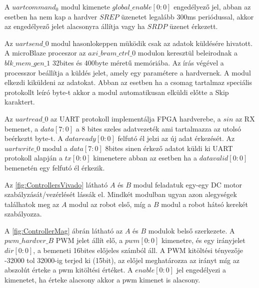 A $uartcommand_0$ modul kimenete $global\_enable[0:0]$ engedélyező jel, abban az esetben ha nem kap a hardver $SREP$ üzenetet legalább 300ms periódussal, akkor az engedélyező jelet alacsonyra állítja vagy ha $SRDP$ üzenet érkezett.

Az $uartsend\_0$ modul hasonlokeppen müködik csak az adatok küldésére hivatott. A microBlaze proceszor az $axi\_bram\_ctrl\_0$ modulon keresztül beleirodnak a $blk\_mem\_gen\_1$ \cite{DualPortRam} 32bites és 400byte méretű memóriába.
Az írás végével a processzor beállítja a küldés jelet, amely egy paramétere a hardvernek. A modul elkezdi kiküldeni az adatokat. Abban az esetben ha a csomag tartalmaz speciális protokollt leíró byte-t akkor a modul automatikusan elküldi előtte a Skip karaktert.

Az $uartread\_0$ az UART protokoll implementálja FPGA hardverebe, a $sin$ az RX bemenet, a $data[7:0]$ a 8 bites szeles adatvezeték ami tartalmazza az utolsó beérkeztt byte-t. A $dataready[0:0]$ felfutó él jelzi az új adat érkezését. Az $uartwrite\_0$ modul a $data[7:0]$ 8bites sinen érkező adatot küldi ki UART protokoll alapján a $tx[0:0]$ kimenetere abban az esetben ha a $datavalid[0:0]$ bemenetén egy felfutó él érkezik.

Az \ref{fig:ControllersVivado} látható $A$ és $B$ modul feladatuk egy-egy DC motor szabályzását/vezérlését lássák el. Mindkét modulban ugyan azon alegységek találhatok meg az $A$ modul az robot első, míg a $B$ modul a robot hátsó kerekét szabályozza.

A \ref{fig:ControllerMag} ábrán látható az $A$ és $B$ modulok belső szerkezete. A $pwm\_hardver\_B$ PWM jelet állít elő, a $pwm[0:0]$ kimenetre, és egy irányjelet $dir[0:0]$, a bemeneti 16bites előjeles számból áll. A PWM kitöltési tényezője -32000 tol 32000-ig terjed ki (15bit), az előjel meghatározza az irányt míg az abszolút érteke a pwm kitöltési értéket. A $enable[0:0]$ jel engedélyezi a kimenetet, ha érteke alacsony akkor a pwm kimenet is alacsony.


